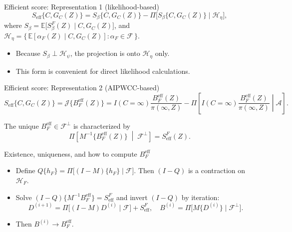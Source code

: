 \documentclass[xcolor=dvipsnames,aspectratio=169]{beamer}
\newcommand{\E}{\mathbb{E}}
\newcommand{\1}{\mathbbm{1}}
\begin{document}
\begin{frame}{Efficient score: Representation 1 (likelihood-based)}
  \[
    S_{\text{eff}}\{C,G_C(Z)\}=S_\beta\{C,G_C(Z)\}-\Pi\big[S_\beta\{C,G_C(Z)\}\mid \mathcal{H}_\eta\big],
  \]
  where $S_\beta=\E\big[S^F_\beta(Z)\mid C,G_C(Z)\big]$, and $\mathcal{H}_\eta=\{\,\E[\alpha_F(Z)\mid C,G_C(Z)]:\alpha_F\in\mathcal{F}\,\}$.
  \begin{itemize}
    \item Because $S_\beta\perp \mathcal{H}_\psi$, the projection is onto $\mathcal{H}_\eta$ only.
    \item This form is convenient for direct likelihood calculations.
  \end{itemize}
\end{frame}

\begin{frame}{Efficient score: Representation 2 (AIPWCC-based)}
  \[
    S_{\text{eff}}\{C,G_C(Z)\}=\mathcal{J}\big\{B_F^{\text{eff}}(Z)\big\}
    =I(C=\infty)\frac{B_F^{\text{eff}}(Z)}{\pi(\infty,Z)}-\Pi\!\left[I(C=\infty)\frac{B_F^{\text{eff}}(Z)}{\pi(\infty,Z)}\middle|\mathcal{A}\right].
  \]
  \begin{tcolorbox}[title=Bridge]
    The unique $B_F^{\text{eff}}\in\mathcal{F}^{\perp}$ is characterized by
    \[
      \Pi\!\left[M^{-1}\{B_F^{\text{eff}}(Z)\}\;\middle|\;\mathcal{F}^{\perp}\right]=S^{F}_{\text{eff}}(Z).
    \]
  \end{tcolorbox}
\end{frame}

\begin{frame}{Existence, uniqueness, and how to compute $B_F^{\text{eff}}$}
  \begin{itemize}
    \item Define $Q\{h_F\}=\Pi\big[(I-M)\{h_F\}\mid \mathcal{F}\big]$. Then $(I-Q)$ is a contraction on $\mathcal{H}_F$.
    \item Solve $(I-Q)\{M^{-1}B_F^{\text{eff}}\}=S^F_{\text{eff}}$ and invert $(I-Q)$ by iteration:
    \[
      D^{(i+1)}=\Pi\big[(I-M)D^{(i)}\mid \mathcal{F}\big]+S^F_{\text{eff}},\quad 
      B^{(i)}=\Pi\big[M\{D^{(i)}\}\mid \mathcal{F}^{\perp}\big].
    \]
    \item Then $B^{(i)}\to B_F^{\text{eff}}$.
  \end{itemize}
\end{frame}
\end{document}

